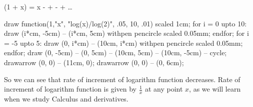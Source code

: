 \startformula\log(1 + x) = x -  +  -  + \ldots\stopformula

\startplacefigure[title=Graph of $\log 2$.]
\startMPcode
draw function(1,"x", "log(x)/log(2)", .05, 10, .01) scaled 1cm;
for i = 0 upto 10:
    draw (i*cm, -5cm) -- (i*cm, 5cm) withpen pencircle scaled 0.05mm;
endfor;
for i = -5 upto 5:
    draw (0, i*cm) -- (10cm, i*cm) withpen pencircle scaled 0.05mm;
endfor;
draw (0, -5cm) -- (0, 5cm) -- (10cm, 5cm) -- (10cm, -5cm) -- cycle;
drawarrow (0, 0) -- (11cm, 0);
drawarrow (0, 0) -- (0, 6cm);
\stopMPcode
\stopplacefigure

So we can see that rate of increment of logarithm function decreases. Rate of increment of logarithm function is given by
$\frac{1}{x}$ at any point $x$, as we will learn when we study Calculus and derivatives.

